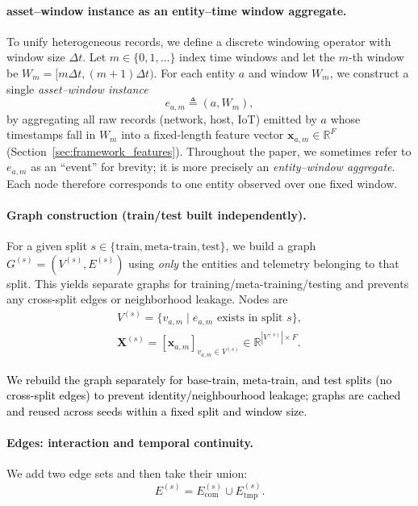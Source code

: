 \documentclass[pdflatex,sn-mathphys-num]{sn-jnl}
\theoremstyle{thmstyleone}%
\theoremstyle{thmstyletwo}%
\theoremstyle{thmstylethree}%
\begin{document}
\paragraph{asset–window instance as an entity--time window aggregate.}
To unify heterogeneous records, we define a discrete windowing operator with window size $\Delta t$.
Let $m\in\{0,1,\ldots\}$ index time windows and let the $m$-th window be
$W_m=[m\Delta t, (m+1)\Delta t)$.
For each entity $a$ and window $W_m$, we construct a single \emph{asset–window instance}
\begin{equation}
e_{a,m} \triangleq (a, W_m),
\end{equation}
by aggregating all raw records (network, host, IoT) emitted by $a$ whose timestamps fall in $W_m$ into a fixed-length feature vector
$\mathbf{x}_{a,m}\in\mathbb{R}^{F}$ (Section~\ref{sec:framework_features}).
Throughout the paper, we sometimes refer to $e_{a,m}$ as an ``event'' for brevity; it is more precisely an \emph{entity--window aggregate}.
Each node therefore corresponds to one entity observed over one fixed window.

\paragraph{Graph construction (train/test built independently).}
For a given split $s\in\{\text{train},\text{meta-train},\text{test}\}$, we build a graph
$G^{(s)}=(V^{(s)},E^{(s)})$ using \emph{only} the entities and telemetry belonging to that split.
This yields separate graphs for training/meta-training/testing and prevents any cross-split edges or neighborhood leakage.
Nodes are
\begin{align}
V^{(s)} = \{v_{a,m}\;|\; e_{a,m}\text{ exists in split }s\}, \\
\mathbf{X}^{(s)}=[\mathbf{x}_{a,m}]_{v_{a,m}\in V^{(s)}}\in\mathbb{R}^{|V^{(s)}|\times F}.
\end{align}

\textcolor{black} {We rebuild the graph separately for base-train, meta-train, and test splits (no cross-split edges) to prevent identity/neighbourhood leakage; graphs are cached and reused across seeds within a fixed split and window size}.

\paragraph{Edges: interaction and temporal continuity.}
We add two edge sets and then take their union:
\begin{equation}
E^{(s)} = E^{(s)}_{\mathrm{com}} \cup E^{(s)}_{\mathrm{tmp}}.
\end{equation}
\end{document}
